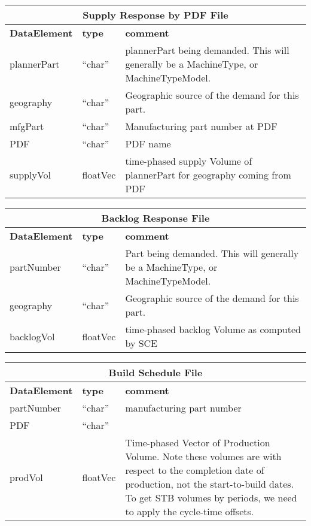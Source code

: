 \vspace{.5in}

\begin{tabular}{llp{4in}}
\multicolumn{3}{c}{{\bf Supply Response by PDF File}}\\ \hline\hline
{\bf DataElement} &  {\bf type}  &   {\bf comment} \\ \hline
plannerPart  & ``char'' &     plannerPart being demanded.  
           This will generally be a
                       MachineType, or MachineTypeModel. \\
geography   & ``char''  &    Geographic source of the demand for this part. \\
mfgPart     & ``char''  & Manufacturing part number at PDF \\
PDF         & ``char''  & PDF name \\
supplyVol   & floatVec&  time-phased supply Volume of plannerPart for 
    geography coming from PDF  
\end{tabular}


\vspace{.5in}

\begin{tabular}{llp{4in}}
\multicolumn{3}{c}{{\bf Backlog Response File}}\\ \hline\hline
{\bf DataElement} &  {\bf type}  &   {\bf comment} \\ \hline
partNumber  & ``char'' &     Part being demanded.  This will generally be a
                       MachineType, or MachineTypeModel. \\
geography   & ``char''  &    Geographic source of the demand for this part. \\
backlogVol   & floatVec&  time-phased backlog Volume as computed by SCE \\
\end{tabular}

\vspace{.5in}

\begin{tabular}{llp{4in}}
\multicolumn{3}{c}{{\bf Build Schedule File}}\\ \hline\hline
{\bf DataElement} &  {\bf type}  &   {\bf comment} \\ \hline
partNumber & ``char''  & manufacturing part number \\
PDF        & ``char''  \\
prodVol    & floatVec&  Time-phased Vector of Production Volume.  Note
                      these volumes are with respect to the completion
                      date of production, not the start-to-build dates.
                      To get STB volumes by periods, we need to apply
                      the cycle-time offsets. \\
\end{tabular}

